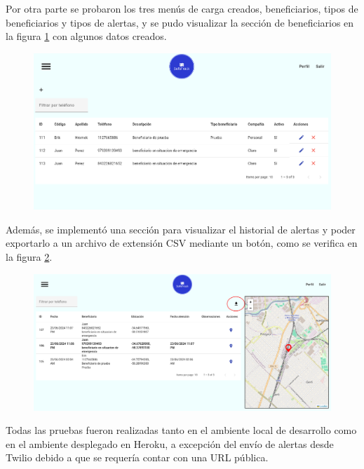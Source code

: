 Por otra parte se probaron los tres menús de carga creados, beneficiarios, tipos de beneficiarios y tipos de alertas, y se pudo visualizar la sección de beneficiarios en la figura \ref{fig:frontend:beneficiarios} con algunos datos creados.

\begin{figure}[H]
	\centering
  	\includegraphics[width=1\linewidth]{./Figures/listado-beneficiarios.png}
  	\label{fig:frontend:beneficiarios}
\end{figure}
	
Además, se implementó una sección para visualizar el historial de alertas y poder exportarlo a un archivo de extensión CSV mediante un botón, como se verifica en la figura \ref{fig:frontend:alertas}.

\begin{figure}[H]
	\centering
  	\includegraphics[width=1\linewidth]{./Figures/listado-alertas.png}
  	\label{fig:frontend:alertas}
\end{figure}

Todas las pruebas fueron realizadas tanto en el ambiente local de desarrollo como en el ambiente desplegado en Heroku, a excepción del envío de alertas desde Twilio debido a que se requería contar con una URL pública.

